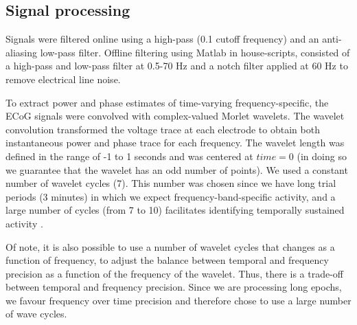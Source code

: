 \documentclass[11pt, onecolumn]{article}
\begin{document}
\subsection{Signal processing}
Signals were filtered online using a high-pass (0.1 cutoff frequency) and an anti-aliasing low-pass filter. %
Offline filtering using Matlab in house-scripts, consisted of a high-pass and low-pass filter at 0.5-70 Hz and a notch filter applied at 60 Hz to remove electrical line noise.

To extract power and phase estimates of time-varying frequency-specific, the ECoG signals were convolved with complex-valued Morlet wavelets. %
The  wavelet convolution transformed the voltage trace at each electrode to obtain both instantaneous power and phase trace for each frequency.
The wavelet length was defined in the range of -1 to 1 seconds and was centered at $time = 0$ (in doing so we guarantee that the wavelet has an odd number of points). 
We used a constant number of wavelet cycles (7). This number was chosen since we have long trial  periods (3 minutes) in which we expect frequency-band-specific activity, and a large number  of cycles (from 7 to 10)  facilitates  identifying  temporally sustained  activity \citep{cohen2014analyzing}. 

Of note, it is also possible to use a number of wavelet cycles that changes as a function of frequency, to adjust the balance between temporal and frequency precision as a function of the frequency of the wavelet. Thus, there is a trade-off between temporal and frequency precision. Since we are processing long epochs, we favour frequency over time precision and therefore chose to use a large number  of wave cycles.
\end{document}

